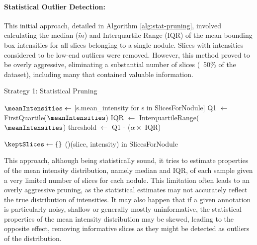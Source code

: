 \paragraph{Statistical Outlier Detection:} This initial approach, detailed in Algorithm \ref{alg:stat-pruning}, involved calculating the median ($\tilde{m}$) and Interquartile Range (IQR) of the mean bounding box intensities for all slices belonging to a single nodule. Slices with intensities considered to be low-end outliers were removed. However, this method proved to be overly aggressive, eliminating a substantial number of slices (~50\% of the dataset), including many that contained valuable information.

\begin{algorithm}[H]
    \caption{Strategy 1: Statistical Pruning}
    \label{alg:stat-pruning}
    \DontPrintSemicolon
    \SetAlgoLined

    
    \BlankLine
    
    $\meanIntensities \gets$ [s.mean\_intensity for s in SlicesForNodule]\;
    Q1 $\gets$ FirstQuartile($\meanIntensities$)\;
    IQR $\gets$ InterquartileRange($\meanIntensities$)\;
    threshold $\gets$ Q1 - ($\alpha \times$ IQR)\;
    
    \BlankLine
    $\keptSlices \gets \{\}$\;
    \ForAll(){(slice, intensity) \textup{in} SlicesForNodule}{
    }
    \Return{$\keptSlices$}\;
\end{algorithm}


This approach, although being statistically sound, it tries to estimate properties of the mean intensity distribution, namely median and IQR, of each sample given a very limited number of slices for each nodule. This limitation often leads to an overly aggressive pruning, as the statistical estimates may not accurately reflect the true distribution of intensities.
It may also happen that if a given annotation is particularly noisy, shallow or generally mostly uninformative, the statistical properties of the mean intensity distribution may be skewed, leading to the opposite effect, removing informative slices as they might be detected as outliers of the distribution.


